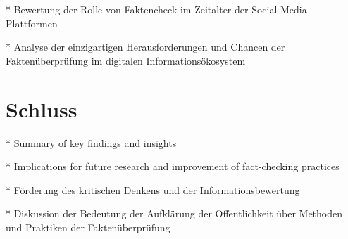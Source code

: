 \documentclass[a4paper,listof=totoc,bibliography=totoc]{scrartcl}
\begin{document}
* Bewertung der Rolle von Faktencheck im Zeitalter der Social-Media-Plattformen

* Analyse der einzigartigen Herausforderungen und Chancen der Faktenüberprüfung im digitalen Informationsökosystem

\section{Schluss}

* Summary of key findings and insights

* Implications for future research and improvement of fact-checking practices

* Förderung des kritischen Denkens und der Informationsbewertung

* Diskussion der Bedeutung der Aufklärung der Öffentlichkeit über Methoden und Praktiken der Faktenüberprüfung

{}

\end{document}
